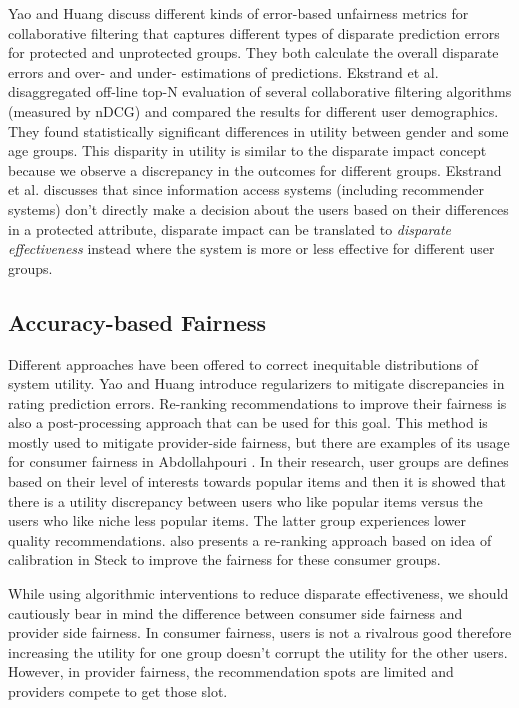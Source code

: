     Yao and Huang \cite{yao_huang_fatml-2017} discuss different kinds of error-based unfairness metrics for collaborative filtering that captures different types of disparate prediction errors for protected and unprotected groups. They both calculate the overall disparate errors and over- and under- estimations of predictions. Ekstrand et al. \cite{ekstrand2018all} disaggregated off-line top-N evaluation of several collaborative filtering algorithms (measured by nDCG) and compared the results for different user demographics. They found statistically significant differences in utility between gender and some age groups. This disparity in utility is similar to the disparate impact concept because we observe a discrepancy in the outcomes for different groups. Ekstrand et al. \cite{ekstrand2021fairness} discusses that since information access systems (including recommender systems) don't directly make a decision about the users based on their differences in a protected attribute, disparate impact can be translated to \textit{disparate effectiveness} instead where the system is more or less effective for different user groups. 
    
    \subsection{Accuracy-based Fairness}
    Different approaches have been offered to correct inequitable distributions of system utility. Yao and Huang \cite{yao2017beyond} introduce regularizers to mitigate discrepancies in rating prediction errors. Re-ranking recommendations to improve their fairness is also a post-processing approach that can be used for this goal. This method is mostly used to mitigate provider-side fairness, but there are examples of its usage for consumer fairness in Abdollahpouri \cite{abdollahpouri2020popularity}. In their research, user groups are defines based on their level of interests towards popular items and then it is showed that there is a utility discrepancy between users who like popular items versus the users who like niche less popular items. The latter group experiences lower quality recommendations. \cite{abdollahpouri2020addressing} also presents a re-ranking approach based on idea of calibration in Steck \cite{steck2018calibrated} to improve the fairness for these consumer groups.
    
    While using algorithmic interventions to reduce disparate effectiveness, we should cautiously bear in mind the difference between consumer side fairness and provider side fairness. In consumer fairness, users is not a rivalrous good therefore increasing the utility for one group doesn't corrupt the utility for the other users. However, in provider fairness, the recommendation spots are limited and providers compete to get those slot. 
    
